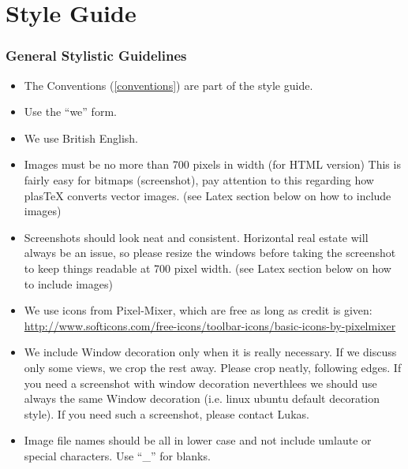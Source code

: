 \section{Style Guide}


\subsubsection{General Stylistic Guidelines}

\begin{itemize}
	\item The Conventions (\ref{conventions}) are part of the style guide.

	\item Use the ``we'' form.

	\item We use British English.

	\item Images must be no more than 700 pixels in width (for HTML version)  This is fairly easy for bitmaps (screenshot), pay attention to this regarding how plasTeX converts vector images. (see Latex section below on how to include images)

    \item Screenshots should look neat and consistent.  Horizontal real estate will always be an issue, so please resize the windows before taking the screenshot to keep things readable at 700 pixel width.  (see Latex section below on how to include images)

	\item We use icons from Pixel-Mixer, which are free as long as credit is given: \url{http://www.softicons.com/free-icons/toolbar-icons/basic-icons-by-pixelmixer}

  \item We include Window decoration only when it is really necessary.  If we discuss only some views, we crop the rest away.  Please crop neatly, following edges. If you need a screenshot with window decoration neverthlees we should use always the same Window decoration (i.e. linux ubuntu default decoration style). If you need such a screenshot, please contact Lukas.

  \item Image file names should be all in lower case and not include umlaute or special characters. Use ``\_'' for blanks.


\end{itemize}
